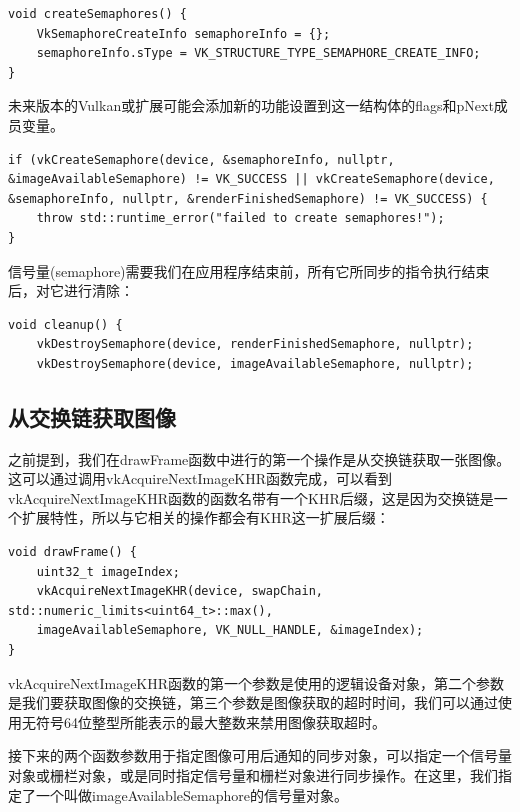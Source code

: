 \documentclass{ctexart}
\begin{document}
\begin{lstlisting}[language={[ANSI]C}]
void createSemaphores() {
	VkSemaphoreCreateInfo semaphoreInfo = {};
	semaphoreInfo.sType = VK_STRUCTURE_TYPE_SEMAPHORE_CREATE_INFO;
}
\end{lstlisting}

未来版本的Vulkan或扩展可能会添加新的功能设置到这一结构体的flags和pNext成员变量。

\begin{lstlisting}[language={[ANSI]C}]
if (vkCreateSemaphore(device, &semaphoreInfo, nullptr, &imageAvailableSemaphore) != VK_SUCCESS || vkCreateSemaphore(device, &semaphoreInfo, nullptr, &renderFinishedSemaphore) != VK_SUCCESS) {
	throw std::runtime_error("failed to create semaphores!");
}
\end{lstlisting}

信号量(semaphore)需要我们在应用程序结束前，所有它所同步的指令执行结束后，对它进行清除：

\begin{lstlisting}[language={[ANSI]C}]
void cleanup() {
	vkDestroySemaphore(device, renderFinishedSemaphore, nullptr);
	vkDestroySemaphore(device, imageAvailableSemaphore, nullptr);
\end{lstlisting}

\subsection{从交换链获取图像}

之前提到，我们在drawFrame函数中进行的第一个操作是从交换链获取一张图像。这可以通过调用vkAcquireNextImageKHR函数完成，可以看到vkAcquireNextImageKHR函数的函数名带有一个KHR后缀，这是因为交换链是一个扩展特性，所以与它相关的操作都会有KHR这一扩展后缀：

\begin{lstlisting}[language={[ANSI]C}]
void drawFrame() {
	uint32_t imageIndex;
	vkAcquireNextImageKHR(device, swapChain, std::numeric_limits<uint64_t>::max(),
	imageAvailableSemaphore, VK_NULL_HANDLE, &imageIndex);
}
\end{lstlisting}

vkAcquireNextImageKHR函数的第一个参数是使用的逻辑设备对象，第二个参数是我们要获取图像的交换链，第三个参数是图像获取的超时时间，我们可以通过使用无符号64位整型所能表示的最大整数来禁用图像获取超时。

接下来的两个函数参数用于指定图像可用后通知的同步对象，可以指定一个信号量对象或栅栏对象，或是同时指定信号量和栅栏对象进行同步操作。在这里，我们指定了一个叫做imageAvailableSemaphore的信号量对象。
\end{document}

